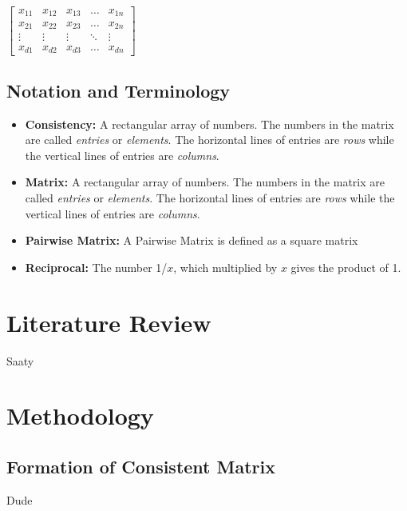 \documentclass[12pt]{amsart}
\theoremstyle{definition}
\begin{document}
\cite{saaty2000fundamentals}

$
\begin{bmatrix}
    x_{11} & x_{12} & x_{13} & \dots  & x_{1n} \\
    x_{21} & x_{22} & x_{23} & \dots  & x_{2n} \\
    \vdots & \vdots & \vdots & \ddots & \vdots \\
    x_{d1} & x_{d2} & x_{d3} & \dots  & x_{dn}
\end{bmatrix}
$

\subsection{Notation and Terminology}
\begin{itemize}
\item \textbf{Consistency:} A rectangular array of numbers.  The numbers in the matrix are called \textit{entries} or \textit{elements}.  The horizontal lines of entries are \textit{rows} while the vertical lines of entries are \textit{columns}.

\item \textbf{Matrix:} A rectangular array of numbers.  The numbers in the matrix are called \textit{entries} or \textit{elements}.  The horizontal lines of entries are \textit{rows} while the vertical lines of entries are \textit{columns}.

\item \textbf{Pairwise Matrix:} A Pairwise Matrix is defined as a square matrix

\item \textbf{Reciprocal:} The number 1/$x$, which multiplied by $x$ gives the product of 1.
\end{itemize}

\section{Literature Review}

%
Saaty

\section{Methodology}

\subsection{Formation of Consistent Matrix}
Dude
\end{document}
